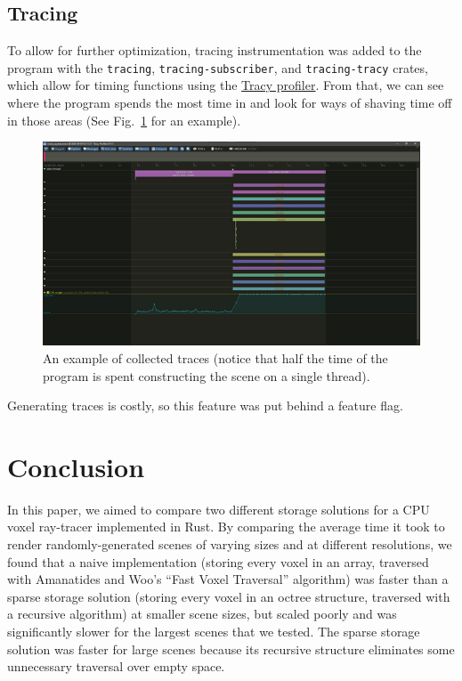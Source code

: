 \documentclass[conference]{IEEEtran}
\begin{document}
\subsection{Tracing}

To allow for further optimization, tracing instrumentation was added to the program with the \verb|tracing|, \verb|tracing-subscriber|, and \verb|tracing-tracy| crates, which allow for timing functions using the \href{https://github.com/wolfpld/tracy}{Tracy profiler}.
From that, we can see where the program spends the most time in and look for ways of shaving time off in those areas (See Fig.~\ref{tracing} for an example).

\begin{figure}[htbp]
\centerline{\includegraphics[width=\linewidth]{tracing}}
\caption{An example of collected traces (notice that half the time of the program is spent constructing the scene on a single thread).}
\label{tracing}
\end{figure}

Generating traces is costly, so this feature was put behind a feature flag.

\section{Conclusion}

In this paper, we aimed to compare two different storage solutions for a CPU voxel ray-tracer implemented in Rust. By comparing the average time it took to render randomly-generated scenes of varying sizes and at different resolutions, we found that a naive implementation (storing every voxel in an array, traversed with Amanatides and Woo’s “Fast Voxel Traversal” algorithm) was faster than a sparse storage solution (storing every voxel in an octree structure, traversed with a recursive algorithm) at smaller scene sizes, but scaled poorly and was significantly slower for the largest scenes that we tested. The sparse storage solution was faster for large scenes because its recursive structure eliminates some unnecessary traversal over empty space.
\end{document}
